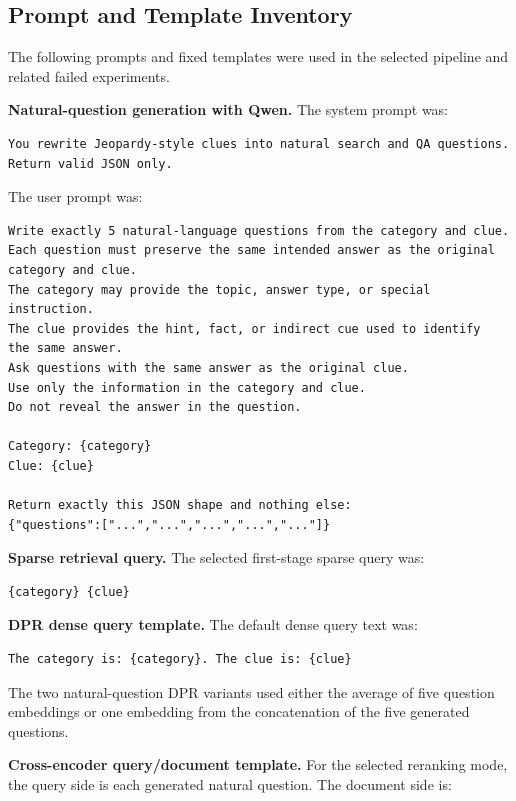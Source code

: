 \documentclass[11pt]{article}
\begin{document}
\subsection{Prompt and Template Inventory}

The following prompts and fixed templates were used in the selected pipeline and related failed experiments.

\textbf{Natural-question generation with Qwen.} The system prompt was:

\begin{verbatim}
You rewrite Jeopardy-style clues into natural search and QA questions.
Return valid JSON only.
\end{verbatim}

The user prompt was:

\begin{verbatim}
Write exactly 5 natural-language questions from the category and clue.
Each question must preserve the same intended answer as the original
category and clue.
The category may provide the topic, answer type, or special instruction.
The clue provides the hint, fact, or indirect cue used to identify
the same answer.
Ask questions with the same answer as the original clue.
Use only the information in the category and clue.
Do not reveal the answer in the question.

Category: {category}
Clue: {clue}

Return exactly this JSON shape and nothing else:
{"questions":["...","...","...","...","..."]}
\end{verbatim}

\textbf{Sparse retrieval query.} The selected first-stage sparse query was:

\begin{verbatim}
{category} {clue}
\end{verbatim}

\textbf{DPR dense query template.} The default dense query text was:

\begin{verbatim}
The category is: {category}. The clue is: {clue}
\end{verbatim}

The two natural-question DPR variants used either the average of five question embeddings or one embedding from the concatenation of the five generated questions.

\textbf{Cross-encoder query/document template.} For the selected reranking mode, the query side is each generated natural question. The document side is:
\end{document}
